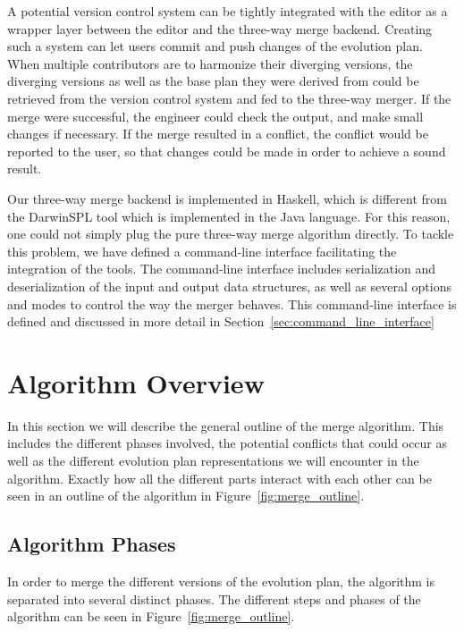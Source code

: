 \documentclass[a4paper,english]{ifimaster}
\begin{document}
A potential version control system can be tightly integrated with the editor as a wrapper layer between the editor and the three-way merge backend. Creating such a system can let users commit and push changes of the evolution plan. When multiple contributors are to harmonize their diverging versions, the diverging versions as well as the base plan they were derived from could be retrieved from the version control system and fed to the three-way merger. If the merge were successful, the engineer could check the output, and make small changes if necessary. If the merge resulted in a conflict, the conflict would be reported to the user, so that changes could be made in order to achieve a sound result.

Our three-way merge backend is implemented in Haskell, which is different from the DarwinSPL tool which is implemented in the Java language. For this reason, one could not simply plug the pure three-way merge algorithm directly. To tackle this problem, we have defined a command-line interface facilitating the integration of the tools. The command-line interface includes serialization and deserialization of the input and output data structures, as well as several options and modes to control the way the merger behaves. This command-line interface is defined and discussed in more detail in Section~\vref{sec:command_line_interface}

\section{Algorithm Overview}%
\label{sec:algorithm_overview}

In this section we will describe the general outline of the merge algorithm. This includes the different phases involved, the potential conflicts that could occur as well as the different evolution plan representations we will encounter in the algorithm. Exactly how all the different parts interact with each other can be seen in an outline of the algorithm in Figure~\vref{fig:merge_outline}.

\subsection{Algorithm Phases}%
\label{sub:algorithm_phases}

In order to merge the different versions of the evolution plan, the algorithm is separated into several distinct phases. The different steps and phases of the algorithm can be seen in Figure~\ref{fig:merge_outline}.
\end{document}
